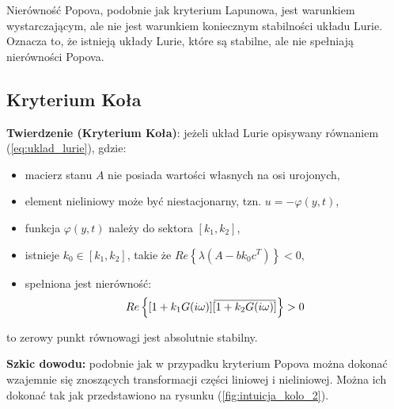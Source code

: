 \documentclass{article}
\newcommand{\overbar}[1]{\mkern 1.5mu\overline{\mkern-1.5mu#1\mkern-1.5mu}\mkern 1.5mu}
\begin{document}
    \begin{tcolorbox}[colback=orange!5, colframe=orange!75!black, title=Uwaga]
        Nierówność Popova, podobnie jak kryterium Lapunowa, jest warunkiem
        wystarczającym, ale nie jest warunkiem koniecznym stabilności układu Lurie.
        Oznacza to, że istnieją układy Lurie, które są stabilne, ale nie spełniają nierówności Popova.
    \end{tcolorbox}

    \subsection{Kryterium Koła}
    \textbf{Twierdzenie (Kryterium Koła)}: jeżeli układ Lurie opisywany równaniem (\ref{eq:uklad_lurie}), gdzie:
    \begin{itemize}
        \item macierz stanu $A$ nie posiada wartości własnych na osi urojonych,
        \item element nieliniowy może być niestacjonarny, tzn. $u = -\varphi(y,t)$,
        \item funkcja $\varphi(y,t)$ należy do sektora $[k_{1}, k_{2}]$,
        \item istnieje $k_{0} \in [k_{1},k_{2}]$, takie że $Re\left\{ \lambda(A-bk_{0}c^{T}) \right\} < 0$,
        \item spełniona jest nierówność:
        $$
            Re\left\{ [1 + k_{1}G(i\omega)]\overbar{[1 + k_{2}G(i\omega)]} \right\} > 0
        $$
    \end{itemize}
    to zerowy punkt równowagi jest absolutnie stabilny.
    
    \textbf{Szkic dowodu:}
    podobnie jak w przypadku kryterium Popova można dokonać wzajemnie się znoszących transformacji części liniowej i nieliniowej.
    Można ich dokonać tak jak przedstawiono na rysunku (\ref{fig:intuicja_kolo_2}).

        
\end{document}
